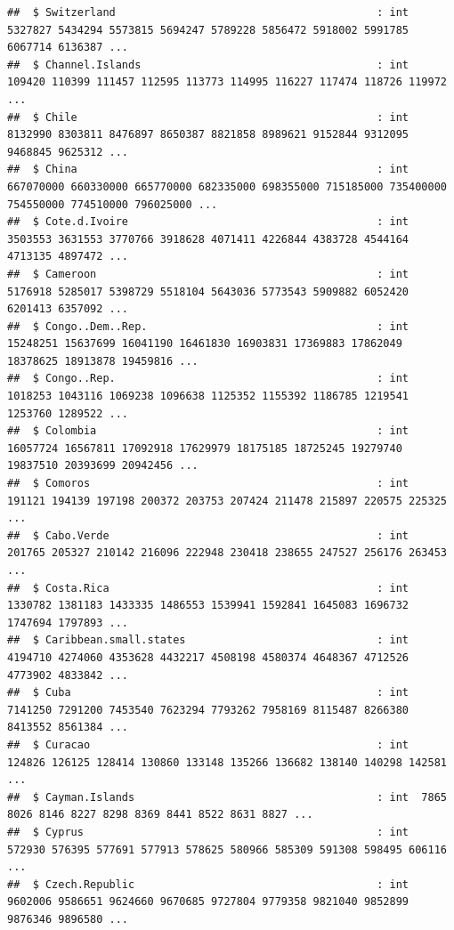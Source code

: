\documentclass[12pt,]{article}
\begin{document}
\begin{verbatim}
##  $ Switzerland                                         : int  5327827 5434294 5573815 5694247 5789228 5856472 5918002 5991785 6067714 6136387 ...
##  $ Channel.Islands                                     : int  109420 110399 111457 112595 113773 114995 116227 117474 118726 119972 ...
##  $ Chile                                               : int  8132990 8303811 8476897 8650387 8821858 8989621 9152844 9312095 9468845 9625312 ...
##  $ China                                               : int  667070000 660330000 665770000 682335000 698355000 715185000 735400000 754550000 774510000 796025000 ...
##  $ Cote.d.Ivoire                                       : int  3503553 3631553 3770766 3918628 4071411 4226844 4383728 4544164 4713135 4897472 ...
##  $ Cameroon                                            : int  5176918 5285017 5398729 5518104 5643036 5773543 5909882 6052420 6201413 6357092 ...
##  $ Congo..Dem..Rep.                                    : int  15248251 15637699 16041190 16461830 16903831 17369883 17862049 18378625 18913878 19459816 ...
##  $ Congo..Rep.                                         : int  1018253 1043116 1069238 1096638 1125352 1155392 1186785 1219541 1253760 1289522 ...
##  $ Colombia                                            : int  16057724 16567811 17092918 17629979 18175185 18725245 19279740 19837510 20393699 20942456 ...
##  $ Comoros                                             : int  191121 194139 197198 200372 203753 207424 211478 215897 220575 225325 ...
##  $ Cabo.Verde                                          : int  201765 205327 210142 216096 222948 230418 238655 247527 256176 263453 ...
##  $ Costa.Rica                                          : int  1330782 1381183 1433335 1486553 1539941 1592841 1645083 1696732 1747694 1797893 ...
##  $ Caribbean.small.states                              : int  4194710 4274060 4353628 4432217 4508198 4580374 4648367 4712526 4773902 4833842 ...
##  $ Cuba                                                : int  7141250 7291200 7453540 7623294 7793262 7958169 8115487 8266380 8413552 8561384 ...
##  $ Curacao                                             : int  124826 126125 128414 130860 133148 135266 136682 138140 140298 142581 ...
##  $ Cayman.Islands                                      : int  7865 8026 8146 8227 8298 8369 8441 8522 8631 8827 ...
##  $ Cyprus                                              : int  572930 576395 577691 577913 578625 580966 585309 591308 598495 606116 ...
##  $ Czech.Republic                                      : int  9602006 9586651 9624660 9670685 9727804 9779358 9821040 9852899 9876346 9896580 ...

\end{verbatim}
\end{document}
